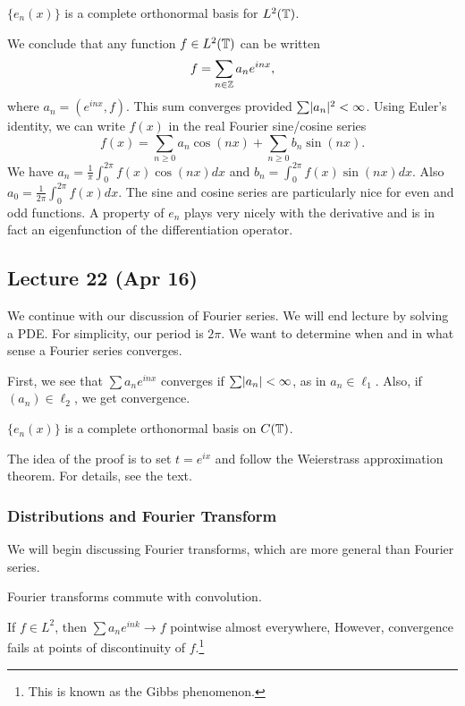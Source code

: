 \documentclass[10pt, twoside]{article}
\begin{document}
    \begin{prop} $\{e_n(x)\}$ is a complete orthonormal basis for $L^2(\mathbb{T})$.
    \end{prop}

    We conclude that any function $f \in L^2(\mathbb{T})$ can be written \[f = \sum_{n
        \in \mathbb{Z}} a_n e^{inx},\] where $a_n = (e^{inx},f)$. This sum converges
        provided $\sum \lvert a_n\rvert^2 < \infty$. Using Euler's identity, we can
        write $f(x)$ in the real Fourier sine/cosine series \[f(x) = \sum_{n
        \geq 0} a_n \cos(nx) + \sum_{n \geq 0} b_n \sin(nx).\] We have $a_n =
        \frac{1}{\pi} \int_0^{2\pi} f(x) \cos(nx) d x$ and $b_n = \int_0^{2\pi}
        f(x) \sin(nx) dx$. Also $a_0 = \frac{1}{2\pi} \int_0^{2\pi} f(x) dx$.
        The sine and cosine series are particularly nice for even and odd
        functions. A property of $e_n$ plays very nicely with the derivative
        and is in fact an eigenfunction of the differentiation operator.

    \subsection{Lecture 22 (Apr 16)} We continue with our discussion of Fourier
    series. We will end lecture by solving a PDE. For simplicity, our period is
    $2 \pi$. We want to determine when and in what sense a Fourier series
    converges.

    First, we see that $\sum a_n e^{inx}$ converges if $\sum \lvert a_n\rvert <
    \infty$, as in $a_n \in \ell_1$. Also, if $(a_n) \in \ell_2$, we get
    convergence.

    \begin{prop} $\{e_n(x)\}$ is a complete orthonormal basis on $C(\mathbb{T})$.
    \end{prop} The idea of the proof is to set $t=e^{ix}$ and follow the
    Weierstrass approximation theorem. For details, see the text.
    
    \subsubsection{Distributions and Fourier Transform} We will begin
    discussing Fourier transforms, which are more general than Fourier series.
    
    \begin{rmk} Fourier transforms commute with convolution.  \end{rmk}

    \begin{thm}[Carleson, 1966] If $f \in L^2$, then $\sum a_n e^{ink} \to f$
    pointwise almost everywhere, However, convergence fails at points of
discontinuity of $f$.\footnote{This is known as the Gibbs phenomenon.}
\end{thm}
\end{document}
